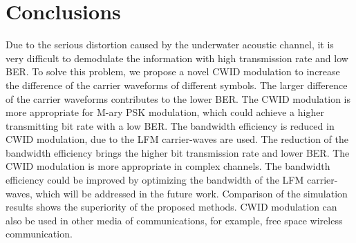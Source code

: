 \documentclass[journal]{IEEEtran}
\begin{document}
\section{Conclusions}
Due to the serious distortion caused by the underwater acoustic
channel, it is very difficult to demodulate the information with
high transmission rate and low BER. To solve this problem, we
propose a novel CWID modulation to increase the difference of the
carrier waveforms of different symbols. The larger difference of the
carrier waveforms contributes to the lower BER. The CWID modulation
is more appropriate for M-ary PSK modulation, which could achieve a
higher transmitting bit rate with a low BER. The bandwidth
efficiency is reduced in CWID modulation, due to the LFM
carrier-waves are used. The reduction of the bandwidth efficiency
brings the higher bit transmission rate and lower BER. The CWID
modulation is more appropriate in complex channels. The bandwidth
efficiency could be improved by optimizing the bandwidth of the LFM
carrier-waves, which will be addressed in the future work.
Comparison of the simulation results shows the superiority of the
proposed methods. CWID modulation can also be used in other media of
communications, for example, free space wireless communication.

















\appendices







\ifCLASSOPTIONcaptionsoff
  \newpage
\fi















\end{document}
